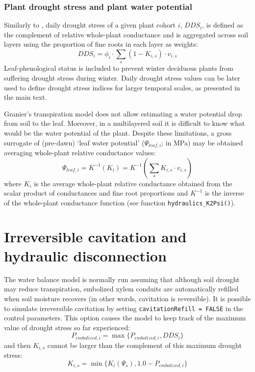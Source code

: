 \documentclass[]{book}
\begin{document}
\subsubsection{Plant drought stress and plant water potential}

Similarly to \citet{Mouillot2002}, daily drought stress of a given plant cohort
\(i\), \(DDS_i\), is defined as the complement of relative whole-plant conductance and
is aggregated across soil layers using the proportion of fine roots in each layer
as weights:
\begin{equation}
DDS_i=\phi_i \cdot \sum_{s}{(1-K_{i,s})\cdot v_{i,s}}
\end{equation}
Leaf-phenological status is included to prevent winter deciduous plants from
suffering drought stress during winter. Daily drought stress values can be later
used to define drought stress indices for larger temporal scales, as presented in
the main text.

Granier's transpiration model does not allow estimating a water potential drop
from soil to the leaf. Moreover, in a multilayered soil it is difficult to know
what would be the water potential of the plant. Despite these limitations, a
gross surrogate of (pre-dawn) `leaf water potential' (\(\Psi_{leaf,i}\); in MPa) may be
obtained averaging whole-plant relative conductance values:
\begin{equation}
\Psi_{leaf,i}=K^{-1}(K_i) = K^{-1}\left(\sum_{s}{K_{i,s}\cdot v_{i,s}}\right)
\end{equation}
where \(K_i\) is the average whole-plant relative conductance obtained from the
scalar product of conductances and fine root proportions and \(K^{-1}\) is the inverse of the whole-plant conductance function (see function \texttt{hydraulics\_K2Psi()}).

\hypertarget{irreversible-cavitation-and-hydraulic-disconnection}{%
\section{Irreversible cavitation and hydraulic disconnection}\label{irreversible-cavitation-and-hydraulic-disconnection}}

The water balance model is normally run assuming that although soil drought may
reduce transpiration, embolized xylem conduits are automatically refilled when
soil moisture recovers (in other words, cavitation is reversible). It is possible
to simulate irreversible cavitation by setting \texttt{cavitationRefill\ =\ FALSE} in the control parameters. This option causes the model to keep track of the maximum value of drought stress so far experienced:
\begin{equation}
P_{embolized,i}= \max \{P_{embolized,i}, DDS_i \}
\end{equation}
and then \(K_{i,s}\) cannot be larger than the complement of this maximum drought
stress:
\begin{equation}
K_{i,s} = \min \{K_{i}(\Psi_s), 1.0 - P_{embolized,i} \}
\end{equation}
\end{document}
